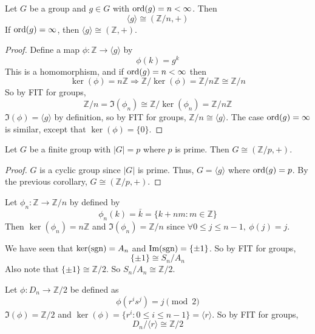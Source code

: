 \begin{corollary}
	Let $G$ be a group and $g \in G$ with $\text{ord}(g) = n < \infty$. Then
	\[
		\langle g \rangle \cong (\mathbb{Z} / n, +)
	\]
	If $\text{ord}(g) = \infty$, then $\langle g \rangle \cong (\mathbb{Z}, +)$.
\end{corollary}

\begin{proof}
	Define a map $\phi: \mathbb{Z} \rightarrow \langle g \rangle$ by
	\[
		\phi(k) = g^k
	\]
	This is a homomorphism, and if $\text{ord}(g) = n < \infty$ then
	\[
		\ker(\phi) = n \mathbb{Z} \Longrightarrow \mathbb{Z} / \ker(\phi) = \mathbb{Z} / n \mathbb{Z} \cong \mathbb{Z} / n
	\]
	So by FIT for groups,
	\[
		\mathbb{Z} / n = \Im(\phi_n) \cong \mathbb{Z} / \ker(\phi_n) = \mathbb{Z} / n \mathbb{Z}
	\]
	$\Im(\phi) = \langle g \rangle$ by definition, so by FIT for groups, $\mathbb{Z} / n \cong \langle g \rangle$. The case $\text{ord}(g) = \infty$ is similar, except that $\ker(\phi) = \{ 0 \}$.
\end{proof}

\begin{corollary}
	Let $G$ be a finite group with $|G| = p$ where $p$ is prime. Then $G \cong (\mathbb{Z} / p, +)$.
\end{corollary}

\begin{proof}
	$G$ is a cyclic group since $|G|$ is prime. Thus, $G = \langle g \rangle$ where $\text{ord}(g) = p$. By the previous corollary, $G \cong (\mathbb{Z} / p, +)$.
\end{proof}

\begin{example}
	Let $\phi_n: \mathbb{Z} \rightarrow \mathbb{Z} / n$ by defined by
	\[
		\phi_n(k) = \bar{k} = \{ k + nm: m \in \mathbb{Z} \}
	\]
	Then $\ker(\phi_n) = n \mathbb{Z}$ and $\Im(\phi_n) = \mathbb{Z} / n$ since $\forall 0 \le j \le n - 1, \ \phi(j) = j$.
\end{example}

\begin{example}
	We have seen that $\ker(\text{sgn}) = A_n$ and $\text{Im}(\text{sgn}) = \{ \pm 1 \}$. So by FIT for groups,
	\[
		\{ \pm 1 \} \cong S_n / A_n
	\]
	Also note that $\{ \pm 1 \} \cong \mathbb{Z} / 2$. So $S_n / A_n \cong \mathbb{Z} / 2$.
\end{example}

\begin{example}
	Let $\phi: D_n \rightarrow \mathbb{Z} / 2$ be defined as
	\[
		\phi(r^i s^j) = j \pmod{2}
	\]
	$\Im(\phi) = \mathbb{Z} / 2$ and $\ker(\phi) = \{ r^i: 0 \le i \le n - 1\} = \langle r \rangle$. So by FIT for groups,
	\[
		D_n / \langle r \rangle \cong \mathbb{Z} / 2
	\]
\end{example}

